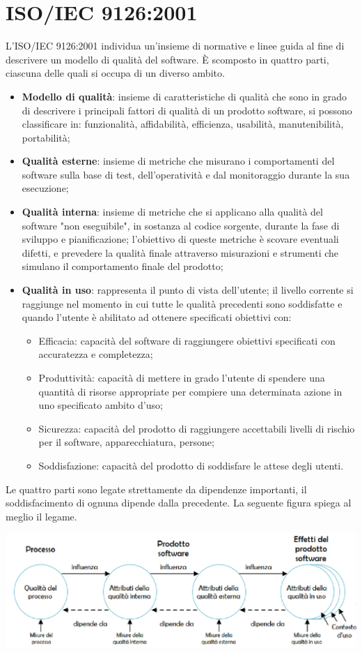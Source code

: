 \section{ISO/IEC 9126:2001}

L'ISO/IEC 9126:2001 individua un'insieme di normative e linee guida al fine di descrivere un modello di qualità del software. \`E scomposto in quattro parti, ciascuna delle quali si occupa di un diverso ambito. 
\begin{itemize}
	\item \textbf{Modello di qualità}: insieme di caratteristiche di qualità che sono in grado di descrivere i principali fattori di qualità di un prodotto software, si possono classificare in: funzionalità, affidabilità, efficienza, usabilità, manutenibilità, portabilità;
	\item \textbf{Qualità esterne}: insieme di metriche che misurano i comportamenti del software sulla base di test, dell'operatività e dal monitoraggio durante la sua esecuzione;
	\item \textbf{Qualità interna}: insieme di metriche che si applicano alla qualità del software "non eseguibile", in sostanza al codice sorgente, durante la fase di sviluppo e pianificazione; l'obiettivo di queste metriche è scovare eventuali difetti, e prevedere la qualità finale attraverso misurazioni e strumenti che simulano il comportamento finale del prodotto;
	\item \textbf{Qualità in uso}: rappresenta il punto di vista dell'utente; il livello corrente si raggiunge nel momento in cui tutte le qualità precedenti sono soddisfatte e quando l'utente è abilitato ad ottenere specificati obiettivi con:
	\begin{itemize}
		\item Efficacia: capacità del software di raggiungere obiettivi specificati con accuratezza e completezza;
		\item Produttività: capacità di mettere in grado l'utente di spendere una quantità di risorse appropriate per compiere una determinata azione in uno specificato ambito d'uso;
		\item Sicurezza: capacità del prodotto di raggiungere accettabili livelli di rischio per il software, apparecchiatura, persone;
		\item Soddisfazione: capacità del prodotto di soddisfare le attese degli utenti.
	\end{itemize}	
\end{itemize}
Le quattro parti sono legate strettamente da dipendenze importanti, il soddisfacimento di ognuna dipende dalla precedente. La seguente figura spiega al meglio il legame.
\begin{center}
\item \includegraphics[scale=0.8]{./images/quality_cicle_iso9126.png} 
\end{center}
 